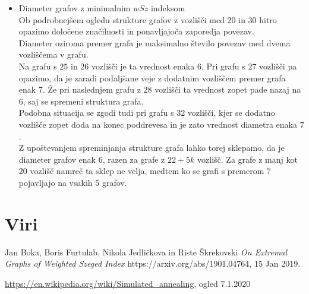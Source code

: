 \documentclass[12pt, a4paper]{article}
\begin{document}
\begin{itemize}
\large  \item  Diameter grafov z minimalnim $wSz$ indeksom\\ \linebreak
Ob podrobnejšem ogledu strukture grafov z vozlišči med 20 in 30 hitro opazimo določene značilnosti in ponavljajoča zaporedja povezav. \\
Diameter oziroma premer grafa je maksimalno število povezav med dvema vozliščema v grafu. \\
Na grafu s $25$ in $26$ vozlišči je ta vrednost enaka $6$. Pri grafu s $27$ vozlišči pa opazimo, da je zaradi podaljšane veje z dodatnim vozliščem premer grafa enak $7$. Že pri naslednjem grafu z $28$ vozlišči ta vrednost zopet pade nazaj na $6$, saj se spremeni struktura grafa. \\
Podobna situacija se zgodi tudi pri grafu s $32$ vozlišči, kjer se dodatno vozlišče zopet doda na konec poddrevesa in je zato vrednost diametra enaka $7$. \\
Z upoštevanjem spreminjanja strukture grafa lahko torej sklepamo, da je diameter grafov enak $6$, razen za grafe z $22 + 5k$ vozlišč. Za grafe z manj kot 20 vozlišč namreč ta sklep ne velja, medtem ko se grafi s premerom $7$ pojavljajo na vsakih 5 grafov.

\end{itemize}
\newpage
\section[Viri]{Viri}

\begin{thebibliography}{9}
Jan Boka, Boris Furtulab, Nikola Jedličkova in Riste Škrekovski
\textit{On Extremal Graphs of Weighted Szeged Index} 
https://arxiv.org/abs/1901.04764, 15 Jan 2019.

\item \emph{} \url{https://en.wikipedia.org/wiki/Simulated_annealing}, ogled 7.1.2020

\end{thebibliography}
\end{document}

